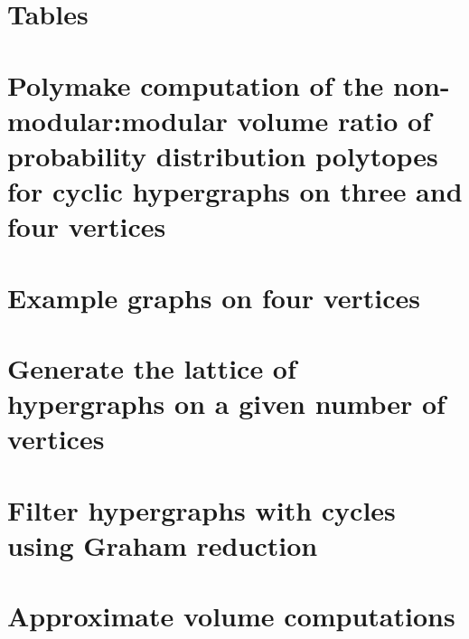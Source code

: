 \FloatBarrier

\section*{Tables}






\FloatBarrier

\section*{Polymake computation of the non-modular:modular volume ratio of probability distribution polytopes for cyclic hypergraphs on three and four vertices}

\pagebreak

\section*{Example graphs on four vertices}

\pagebreak

\section*{Generate the lattice of hypergraphs on a given number of vertices}

\pagebreak

\section*{Filter hypergraphs with cycles using Graham reduction}

\pagebreak

\section*{Approximate volume computations}



